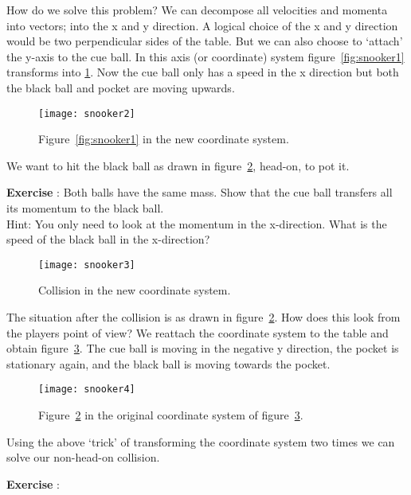 How do we solve this problem? We can decompose all velocities and momenta into vectors; into the x and y direction. A logical choice of the x and y direction would be two perpendicular sides of the table. But we can also choose to `attach' the y-axis to the cue ball. In this axis (or coordinate) system figure~\ref{fig:snooker1} transforms into \ref{fig:snooker2}. Now the cue ball only has a speed in the x direction but both the black ball and pocket are moving upwards.

\begin{figure}[h]\begin{center}
\texttt{[image: snooker2]}%
\caption{Figure~\ref{fig:snooker1} in the new coordinate system.}\label{fig:snooker2}
\end{center}\end{figure}

We want to hit the black ball as drawn in figure~\ref{fig:snooker3}, head-on, to pot it. 
\begin{shaded}
\textbf{Exercise \theExercise {}} : Both balls have the same mass. Show that the cue ball transfers all its momentum to the black ball.\\
Hint: You only need to look at the momentum in the x-direction. What is the speed of the black ball in the x-direction?
\end{shaded}

\begin{figure}\begin{center}
\texttt{[image: snooker3]}%
\caption{Collision in the new coordinate system.}\label{fig:snooker3}
\end{center}\end{figure}

The situation after the collision is as drawn in figure~\ref{fig:snooker3}. How does this look from the players point of view? We reattach the coordinate system to the table and obtain figure~\ref{fig:snooker4}. The cue ball is moving in the negative y direction, the pocket is stationary again, and the black ball is moving towards the pocket. 

\begin{figure}\begin{center}
\texttt{[image: snooker4]}%
\caption{Figure~\ref{fig:snooker3} in the original coordinate system of figure~\ref{fig:snooker4}.}\label{fig:snooker4}
\end{center}\end{figure}

Using the above `trick' of transforming the coordinate system two times we can solve our non-head-on collision.




\begin{shaded}
\textbf{Exercise \theExercise {}} : \end{shaded}

\footnotemark
\footnotetext{}

